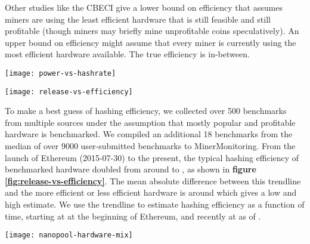 Other studies like the CBECI give a lower bound on efficiency that assumes miners are using the least efficient hardware that is still feasible and still profitable (though miners may briefly mine unprofitable coins speculatively). An upper bound on efficiency might assume that every miner is currently using the most efficient hardware available. The true efficiency is in-between.

\begin{figure*}[htp]
    \centering
    \texttt{[image: power-vs-hashrate]}
    \caption{GPU power usage vs hashrate reported by users on MinerMonitoring, showing large variation across the same GPU models.}
    \label{fig:power-vs-hashrate}
\end{figure*}

\begin{figure*}[htp]
    \centering
    \texttt{[image: release-vs-efficiency]}
    \caption{Plot of hardware hashing efficiency increasing over time, with hardware names drawn next to the median efficiency across multiple benchmarks.}
    \label{fig:release-vs-efficiency}
\end{figure*}

To make a best guess of hashing efficiency, we collected over 500 benchmarks from multiple sources under the assumption that mostly popular and profitable hardware is benchmarked. We compiled an additional 18 benchmarks from the median of over 9000 user-submitted benchmarks to MinerMonitoring\cite{minermonitoring_gpu_2021}. From the launch of Ethereum (2015-07-30) to the present, the typical hashing efficiency of benchmarked hardware doubled from around  to , as shown in \textbf{figure \ref{fig:release-vs-efficiency}}. The mean absolute difference between this trendline and the more efficient or less efficient hardware is around  which gives a low and high estimate. We use the trendline to estimate hashing efficiency as a function of time, starting at  at the beginning of Ethereum, and recently at  as of .

\begin{figure*}[htp]
    \centering
    \texttt{[image: nanopool-hardware-mix]}
    \caption{Total hashrate of active workers on Nanopool that match one of 28 common hardware terms, over multiple days during 2021-10 through 2021-11.}
    \label{fig:nanopool-hardware-mix}
\end{figure*}

